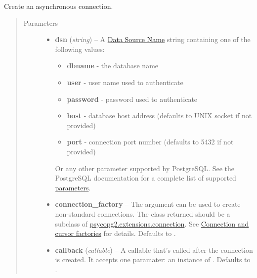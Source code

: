 \documentclass[letterpaper,10pt,english]{sphinxmanual}
\begin{document}
\begin{fulllineitems}
\label{api:momoko.Connection}
Create an asynchronous connection.
\begin{quote}\begin{description}
\item[{Parameters}] \leavevmode\begin{itemize}
\item {} 
\textbf{dsn} (\emph{string}) -- 
A \href{http://en.wikipedia.org/wiki/Data\_Source\_Name}{Data Source Name} string containing one of the following values:
\begin{itemize}
\item {} 
\textbf{dbname} - the database name

\item {} 
\textbf{user} - user name used to authenticate

\item {} 
\textbf{password} - password used to authenticate

\item {} 
\textbf{host} - database host address (defaults to UNIX socket if not provided)

\item {} 
\textbf{port} - connection port number (defaults to 5432 if not provided)

\end{itemize}

Or any other parameter supported by PostgreSQL. See the PostgreSQL
documentation for a complete list of supported \href{http://www.postgresql.org/docs/current/static/libpq-connect.html\#LIBPQ-PQCONNECTDBPARAMS}{parameters}.


\item {} 
\textbf{connection\_factory} -- The  argument can be used to create non-standard
connections. The class returned should be a subclass of \href{http://initd.org/psycopg/docs/connection.html\#connection}{psycopg2.extensions.connection}.
See \href{http://initd.org/psycopg/docs/advanced.html\#subclassing-cursor}{Connection and cursor factories} for details. Defaults to .

\item {} 
\textbf{callback} (\emph{callable}) -- A callable that's called after the connection is created. It accepts one
paramater: an instance of {\hyperref[api:momoko.Connection]{}}. Defaults to .


\end{itemize}
\end{description}
\end{quote}
\end{fulllineitems}
\end{document}
